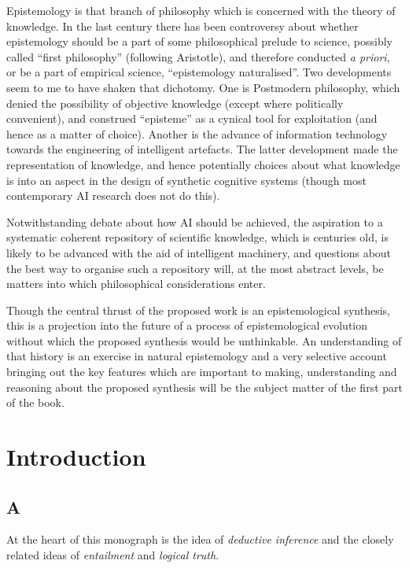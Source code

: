\documentclass[10pt,titlepage]{book}
\begin{document}
Epistemology is that branch of philosophy which is concerned with the theory of knowledge.
In the last century there has been controversy about whether epistemology should be a part of some philosophical prelude to science, possibly called “first philosophy” (following Aristotle), and therefore conducted \emph{a priori}, or be a part of empirical science, “epistemology naturalised”.
Two developments seem to me to have shaken that dichotomy.
One is Postmodern philosophy, which denied the possibility of objective knowledge (except where politically convenient), and construed “episteme” as a cynical tool for exploitation (and hence as a matter of choice).
Another is the advance of information technology towards the engineering of intelligent artefacts.  The latter development made the representation of knowledge, and hence potentially choices about what knowledge is into an aspect in the design of synthetic cognitive systems (though most contemporary AI research does not do this).

Notwithstanding debate about how AI should be achieved, the aspiration to a systematic coherent repository of scientific knowledge, which is centuries old, is likely to be advanced with the aid of intelligent machinery, and questions about the best way to organise such a repository will, at the most abstract levels, be matters into which philosophical considerations enter.

Though the central thrust of the proposed work is an epistemological synthesis, this is a projection into the future of a process of epistemological evolution without which the proposed synthesis would be unthinkable.  An understanding of that history is an exercise in natural epistemology and a very selective account bringing out the key features which are important to making, understanding and reasoning about the proposed synthesis will be the subject matter of the first part of the book.


\chapter{Introduction}


\section{A}

At the heart of this monograph is the idea of \emph{deductive inference} and the closely related ideas of \emph{entailment} and \emph{logical truth}.
\end{document}
